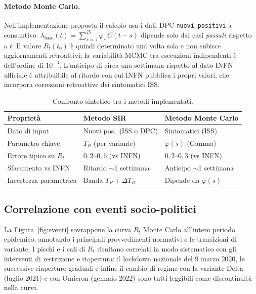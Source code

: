 \documentclass[12pt, a4paper]{article}
\begin{document}
\paragraph{Metodo Monte Carlo.}
Nell'implementazione proposta il calcolo usa i dati DPC \texttt{nuovi\_positivi} a
consuntivo: $\lambda_{\text{base}}(t) = \sum_{s=1}^{25} \varphi_s\, C(t-s)$ dipende solo
dai casi \emph{passati} rispetto a $t$.
Il valore $R_t(t_0)$ è quindi determinato una volta sola e non subisce aggiornamenti
retroattivi; la variabilità MCMC tra esecuzioni indipendenti è dell'ordine di $10^{-3}$.
L'anticipo di circa una settimana rispetto al dato INFN ufficiale è attribuibile al ritardo
con cui INFN pubblica i propri valori, che incorpora correzioni retroattive dei sintomatici ISS.

\begin{table}[htbp]
\centering
\caption{Confronto sintetico tra i metodi implementati.}
\label{tab:confronto}
\begin{tabular}{p{3.8cm}p{5.5cm}p{5cm}}
\toprule
\textbf{Proprietà}           & \textbf{Metodo SIR}             & \textbf{Metodo Monte Carlo} \\
\midrule
Dato di input                & Nuovi pos.\ (ISS o DPC)         & Sintomatici (ISS) \\
Parametro chiave             & $T_R$ (per variante)            & $\varphi(s)$ (Gamma) \\
Errore tipico su $R_t$       & $0{,}2$--$0{,}6$ (vs INFN)      & $0{,}2$--$0{,}3$ (vs INFN) \\
Sfasamento vs INFN           & Ritardo $\sim$1 settimana       & Anticipo $\sim$1 settimana \\
Incertezza parametrica       & Banda $T_R \pm \Delta T_R$      & Dipende da $\varphi(s)$ \\
\bottomrule
\end{tabular}
\end{table}

\subsection{Correlazione con eventi socio-politici}

La Figura~\ref{fig:eventi} sovrappone la curva $R_t$ Monte Carlo all'intero periodo epidemico,
annotando i principali provvedimenti normativi e le transizioni di variante.
I picchi e i cali di $R_t$ risultano correlati in modo sistematico con gli interventi di
restrizione e riapertura: il lockdown nazionale del 9 marzo 2020, le successive riaperture
graduali e infine il cambio di regime con la variante Delta (luglio 2021) e con Omicron
(gennaio 2022) sono tutti leggibili come discontinuità nella curva.
\end{document}
